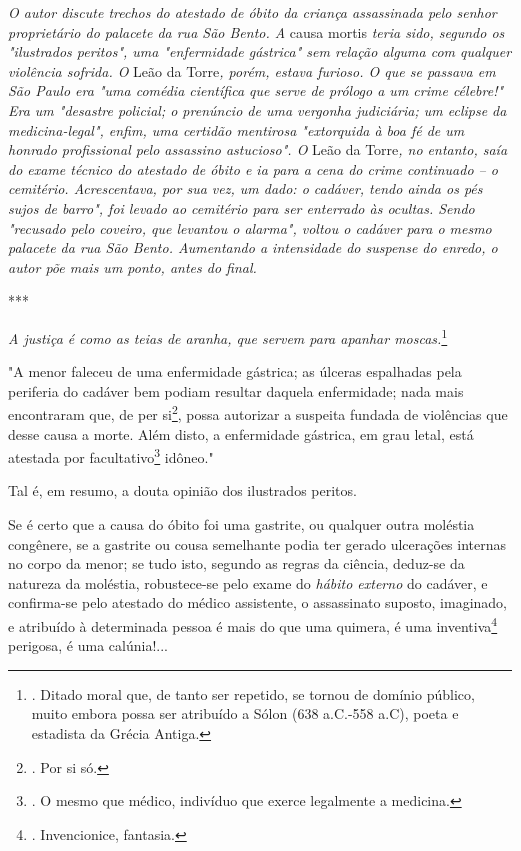 \emph{O autor discute trechos do atestado de óbito da criança
assassinada pelo senhor proprietário do palacete da rua São Bento. A}
causa mortis \emph{teria sido, segundo os "ilustrados peritos", uma
"enfermidade gástrica" sem relação alguma com qualquer violência
sofrida. O} Leão da Torre\emph{, porém, estava furioso. O que se passava
em São Paulo era "uma comédia científica que serve de prólogo a um crime
célebre!" Era um "desastre policial; o prenúncio de uma vergonha
judiciária; um eclipse da medicina-legal", enfim, uma certidão mentirosa
"extorquida à boa fé de um honrado profissional pelo assassino
astucioso". O} Leão da Torre\emph{, no entanto, saía do exame técnico do
atestado de óbito e ia para a cena do crime continuado -- o cemitério.
Acrescentava, por sua vez, um dado: o cadáver, tendo ainda os pés sujos
de barro", foi levado ao cemitério para ser enterrado às ocultas. Sendo
"recusado pelo coveiro, que levantou o alarma", voltou o cadáver para o
mesmo palacete da rua São Bento. Aumentando a intensidade do suspense do
enredo, o autor põe mais um ponto, antes do final.}

***

\emph{A justiça é como as teias de aranha, que servem para apanhar
moscas.}\footnote{. Ditado moral que, de tanto ser repetido, se tornou
  de domínio público, muito embora possa ser atribuído a Sólon (638
  a.C.-558 a.C), poeta e estadista da Grécia Antiga.}

"A menor faleceu de uma enfermidade gástrica; as úlceras espalhadas pela
periferia do cadáver bem podiam resultar daquela enfermidade; nada mais
encontraram que, de per si\footnote{. Por si só.}, possa autorizar a
suspeita fundada de violências que desse causa a morte. Além disto, a
enfermidade gástrica, em grau letal, está atestada por
facultativo\footnote{. O mesmo que médico, indivíduo que exerce
  legalmente a medicina.} idôneo."

Tal é, em resumo, a douta opinião dos ilustrados peritos.

Se é certo que a causa do óbito foi uma gastrite, ou qualquer outra
moléstia congênere, se a gastrite ou cousa semelhante podia ter gerado
ulcerações internas no corpo da menor; se tudo isto, segundo as regras
da ciência, deduz-se da natureza da moléstia, robustece-se pelo exame do
\emph{hábito externo} do cadáver, e confirma-se pelo atestado do médico
assistente, o assassinato suposto, imaginado, e atribuído à determinada
pessoa é mais do que uma quimera, é uma inventiva\footnote{.
  Invencionice, fantasia.} perigosa, é uma calúnia!...

